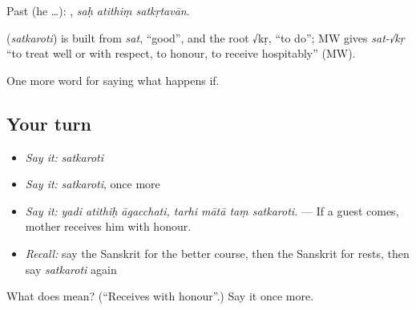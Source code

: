 Past (he …):   , \emph{saḥ atithiṃ satkṛtavān}.

\begin{cousinweb}
\textbf{} (\emph{satkaroti}) is built from \emph{sat}, \textquotedblleft{}good\textquotedblright{}, and the root √kṛ, \textquotedblleft{}to do\textquotedblright{}; MW gives \emph{sat-√kṛ} \textquotedblleft{}to treat well or with respect, to honour, to receive hospitably\textquotedblright{} (MW).
\end{cousinweb}

\begin{grammarlens}[title={What you've built}]
One more word for saying what happens if.
\end{grammarlens}

\subsection*{Your turn}
\begin{itemize}
\raggedright
  \item \emph{Say it:} \emph{satkaroti}
  \item \emph{Say it:} \emph{satkaroti}, once more
  \item \emph{Say it:} \emph{yadi atithiḥ āgacchati, tarhi mātā taṃ satkaroti.} — If a guest comes, mother receives him with honour.
  \item \emph{Recall:} say the Sanskrit for the better course, then the Sanskrit for rests, then say \emph{satkaroti} again
\end{itemize}

\begin{tcolorbox}[breakable,colback=teal!4,colframe=teal!35!black,title={Before you move on}]
What does  mean? (\textquotedblleft{}Receives with honour\textquotedblright{}.) Say it once more.
\end{tcolorbox}
